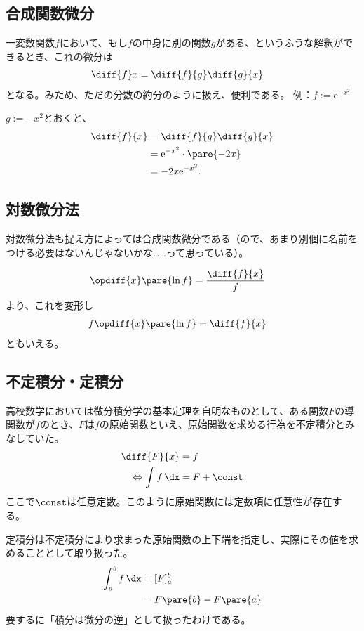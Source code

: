 \subsection{合成関数微分}
一変数関数$f$において、もし$f$の中身に別の関数$g$がある、というふうな解釈ができるとき、これの微分は
\begin{align}
    \diff{f}x & =\diff{f}{g}\diff{g}{x}\label{eq:1.4}
\end{align}
となる。みため、ただの分数の約分のように扱え、便利である。
\baselineskip
例：$f:=\mathrm{e}^{-x^2}$

$g:=-x^2$とおくと、
\begin{align*}
    \diff{f}{x} & =\diff{f}{g}\diff{g}{x}           \\
                & =\mathrm{e}^{-x^2}\cdot\pare{-2x} \\
                & =-2x\mathrm{e}^{-x^2}.
\end{align*}
\subsection{対数微分法}
対数微分法も捉え方によっては合成関数微分である（ので、あまり別個に名前をつける必要はないんじゃないかな……って思っている）。

\begin{align*}
    \opdiff{x}\pare{\ln f} & =\frac{\diff{f}{x}}{f}
\end{align*}
より、これを変形し
\begin{align}
    f\opdiff{x}\pare{\ln f} & =\diff{f}{x}
\end{align}
ともいえる。

\subsection{不定積分・定積分}
高校数学においては微分積分学の基本定理を自明なものとして、ある関数$F$の導関数が$f$のとき、$F$は$f$の原始関数といえ、原始関数を求める行為を不定積分とみなしていた。
\begin{align}
    \begin{aligned}
        \diff{F}{x}                 & =f        \\
        \Leftrightarrow \int f\,\dx & =F+\const
    \end{aligned}\label{eq:1.5}
\end{align}
ここで$\const$は任意定数。このように原始関数には定数項に任意性が存在する。

定積分は不定積分により求まった原始関数の上下端を指定し、実際にその値を求めることとして取り扱った。
\begin{align}
    \begin{aligned}
        \int_a^b f\,\dx & =[F]_a^b             \\
                        & =F\pare{b}-F\pare{a}
    \end{aligned}\label{eq:1.6}
\end{align}
要するに「積分は微分の逆」として扱ったわけである。
